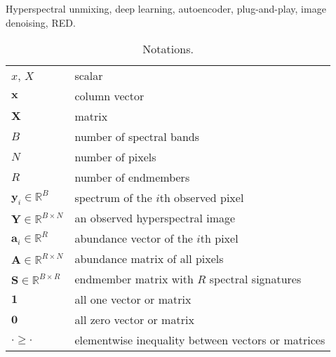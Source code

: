 \documentclass[journal,a4paper]{IEEEtran}
\newcommand{\MATabund}{\mathbf{A}}
\newcommand{\MATend}{\mathbf{S}}
\begin{document}
\begin{IEEEkeywords}
Hyperspectral unmixing, deep learning, autoencoder, plug-and-play, image denoising, RED.
\end{IEEEkeywords}

\IEEEpeerreviewmaketitle
\begin{table}[h]
\centering
\renewcommand\arraystretch{1.15}
\caption{Notations.}\label{Tab_notation}
\begin{tabular}{ll}
$x$, $X$ & scalar \\
$\mathbf{x}$ & column vector \\
$\mathbf{X}$ & matrix \\
$B$ & number of spectral bands \\
$N$ & number of pixels \\
$R$ & number of endmembers \\
$\mathbf{y}_i\in\mathbb{R}^{B}$ & spectrum of the $i$th observed pixel \\
$\mathbf{Y}\in\mathbb{R}^{B\times N}$ & an observed hyperspectral image \\
$\mathbf{a}_i\in\mathbb{R}^{R}$ & abundance vector of the $i$th pixel \\
$\MATabund\in\mathbb{R}^{R\times N}$ & abundance matrix of all pixels \\
$\MATend\in\mathbb{R}^{B\times R}$ & endmember matrix with $R$ spectral signatures \\
$\boldsymbol{1}$ & all one vector or matrix \\
$\boldsymbol{0}$ & all zero vector or matrix\\
$\cdot\geq\cdot$ & elementwise inequality between vectors or matrices
\end{tabular}
\end{table}
\end{document}
